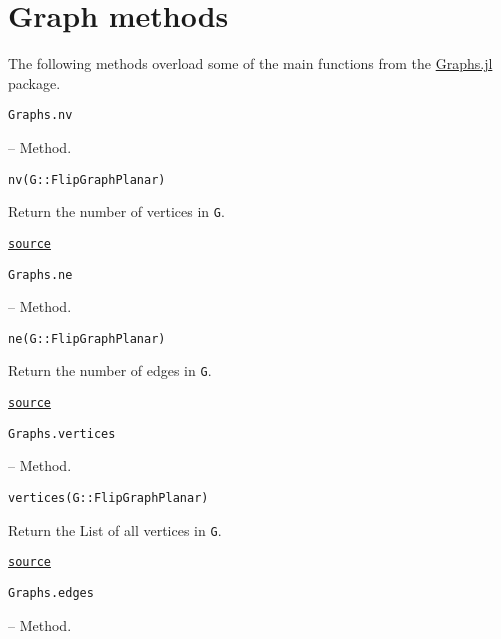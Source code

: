 \section{Graph methods}



\label{18181481596881829449}{}


The following methods overload some of the main functions from the \href{https://juliagraphs.org/Graphs.jl/stable/}{Graphs.jl} package.


\hypertarget{12642971583515548947}{\texttt{Graphs.nv}}  -- {Method.}

\begin{adjustwidth}{2em}{0pt}


\begin{verbatim}
nv(G::FlipGraphPlanar)
\end{verbatim}

Return the number of vertices in \texttt{G}.



\href{https://github.com/schto223/FlipGraphs.jl/blob/e35d43698a06b86273148826b79d585ba04fcd26/src/flipGraphPlanar.jl#L83-L87}{\texttt{source}}


\end{adjustwidth}
\hypertarget{12070345305935665180}{\texttt{Graphs.ne}}  -- {Method.}

\begin{adjustwidth}{2em}{0pt}


\begin{verbatim}
ne(G::FlipGraphPlanar)
\end{verbatim}

Return the number of edges in \texttt{G}.



\href{https://github.com/schto223/FlipGraphs.jl/blob/e35d43698a06b86273148826b79d585ba04fcd26/src/flipGraphPlanar.jl#L76-L80}{\texttt{source}}


\end{adjustwidth}
\hypertarget{11409300395072670495}{\texttt{Graphs.vertices}}  -- {Method.}

\begin{adjustwidth}{2em}{0pt}


\begin{verbatim}
vertices(G::FlipGraphPlanar)
\end{verbatim}

Return the List of all vertices in \texttt{G}.



\href{https://github.com/schto223/FlipGraphs.jl/blob/e35d43698a06b86273148826b79d585ba04fcd26/src/flipGraphPlanar.jl#L90-L94}{\texttt{source}}


\end{adjustwidth}
\hypertarget{17434895256593567637}{\texttt{Graphs.edges}}  -- {Method.}

